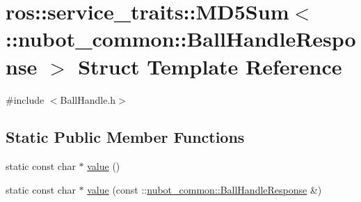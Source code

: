 \hypertarget{structros_1_1service__traits_1_1MD5Sum_3_01_1_1nubot__common_1_1BallHandleResponse_01_4}{\section{ros\-:\-:service\-\_\-traits\-:\-:M\-D5\-Sum$<$ \-:\-:nubot\-\_\-common\-:\-:Ball\-Handle\-Response $>$ Struct Template Reference}
\label{structros_1_1service__traits_1_1MD5Sum_3_01_1_1nubot__common_1_1BallHandleResponse_01_4}
}


{\ttfamily \#include $<$Ball\-Handle.\-h$>$}

\subsection*{Static Public Member Functions}
\begin{DoxyCompactItemize}
\item 
static const char $\ast$ \hyperlink{structros_1_1service__traits_1_1MD5Sum_3_01_1_1nubot__common_1_1BallHandleResponse_01_4_ae94fc0abc5c2a82bb6e04895cb2d3f93}{value} ()
\item 
static const char $\ast$ \hyperlink{structros_1_1service__traits_1_1MD5Sum_3_01_1_1nubot__common_1_1BallHandleResponse_01_4_ac30ea6839dca1b85c9ba2446f8e1200f}{value} (const \-::\hyperlink{namespacenubot__common_a8444206679493f649058adca72f0e538}{nubot\-\_\-common\-::\-Ball\-Handle\-Response} \&)
\end{DoxyCompactItemize}



